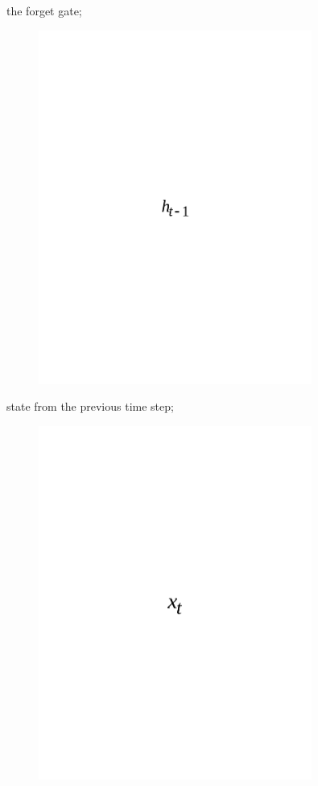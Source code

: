 the forget gate;
\begin{figure}[H]
	\centering
	\includegraphics[width=0.8\textwidth]{media/ict/image49}
	\caption*{}
\end{figure}

state from the previous time step;
\begin{figure}[H]
	\centering
	\includegraphics[width=0.8\textwidth]{media/ict/image50}
	\caption*{}
\end{figure}

